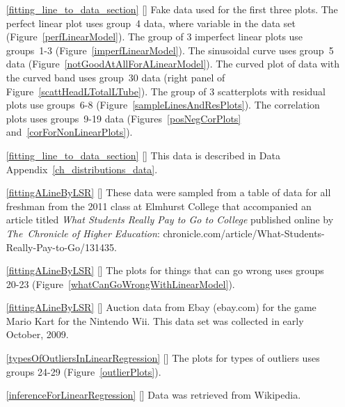 \begin{itemize}
\item[\ref{fitting_line_to_data_section}]
    [\datalink{simulated\_scatter}]
    Fake data used for the first three plots.
    The perfect linear plot uses group~4 data,
    where  variable in the data set
    (Figure~\ref{perfLinearModel}).
    The group of 3 imperfect linear plots use groups~1-3
    (Figure~\ref{imperfLinearModel}).
    The sinusoidal curve uses group~5 data
    (Figure~\ref{notGoodAtAllForALinearModel}).
    The curved plot of data with the curved band
    uses group~30 data
    (right panel of Figure~\ref{scattHeadLTotalLTube}).
    The group of 3 scatterplots with residual plots use groups~6-8
    (Figure~\ref{sampleLinesAndResPlots}).
    The correlation plots uses groups~9-19 data
    (Figures~\ref{posNegCorPlots} and~\ref{corForNonLinearPlots}).
\item[\ref{fitting_line_to_data_section}]
    [\datalink{possum}]
    This data is described in
    Data Appendix~\ref{ch_distributions_data}.

\item[\ref{fittingALineByLSR}]
    [\datalink{elmhurst}]
    These data were sampled from a table of data for all
    freshman from the 2011 class at Elmhurst College that
    accompanied an article titled
    \emph{What Students Really Pay to Go to College}
    published online by \emph{The~Chronicle of Higher Education}:
        {chronicle.com/article/What-Students-Really-Pay-to-Go/131435}.
\item[\ref{fittingALineByLSR}]
    [\datalink{simulated\_scatter}]
    The plots for things that can go wrong uses groups 20-23
    (Figure~\ref{whatCanGoWrongWithLinearModel}).
\item[\ref{fittingALineByLSR}]
    [\datalink{mario\_kart}]
    Auction data from Ebay (ebay.com) for the game Mario Kart
    for the Nintendo Wii.
    This data set was collected in early October, 2009.

\item[\ref{typesOfOutliersInLinearRegression}]
    [\datalink{simulated\_scatter}]
    The plots for types of outliers uses groups 24-29
    (Figure~\ref{outlierPlots}).

\item[\ref{inferenceForLinearRegression}]
    [\datalink{midterms\_house}]
    Data was retrieved from Wikipedia.

\end{itemize}







